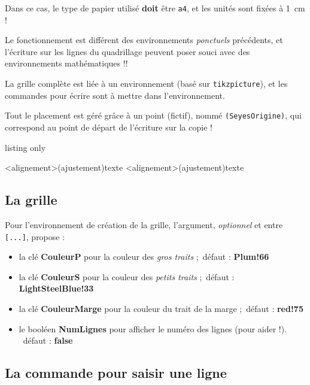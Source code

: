 \documentclass[a4paper]{article}
\newcommand\Cle[1]{{\bfseries\sffamily\textlangle #1\textrangle}}
\begin{document}
Dans ce cas, le type de papier utilisé \textbf{doit} être \texttt{a4}, et les unités sont fixées à 1~cm !

\smallskip

\faBomb{} Le fonctionnement est différent des environnements \textit{ponctuels} précédents, et l'écriture sur les lignes du quadrillage peuvent poser souci avec des environnements mathématiques !!

\medskip

La grille complète est liée à un environnement (basé sur \texttt{tikzpicture}), et les commandes pour écrire sont à mettre dans l'environnement.

\smallskip

Tout le placement est géré grâce à un point (fictif), nommé \texttt{(SeyesOrigine)}, qui correspond au point de départ de l'écriture sur la copie !

\begin{PresentationCode}{listing only}
\begin{PleinePageSeyes}[options]
	\LignePapierSeyes[options]<alignement>(ajustement){texte}
	\ParagraphePapierSeyes[options]<alignement>(ajustement){texte}
\end{PleinePageSeyes}
\end{PresentationCode}

\subsection{La grille}

Pour l'environnement de création de la grille, l'argument, \textit{optionnel} et entre \texttt{[...]}, propose :

\begin{itemize}
	\item la clé \Cle{CouleurP} pour la couleur des \textit{gros traits} ;\hfill~défaut : \Cle{Plum!66}
	\item la clé \Cle{CouleurS} pour la couleur des \textit{petits traits} ;\hfill~défaut : \Cle{LightSteelBlue!33}
	\item la clé \Cle{CouleurMarge} pour la couleur du trait de la marge ;\hfill~défaut : \Cle{red!75}
	\item le booléen \Cle{NumLignes} pour afficher le numéro des lignes (pour aider !). \hfill~défaut : \Cle{false}
\end{itemize}

\subsection{La commande pour saisir une ligne}
\end{document}
